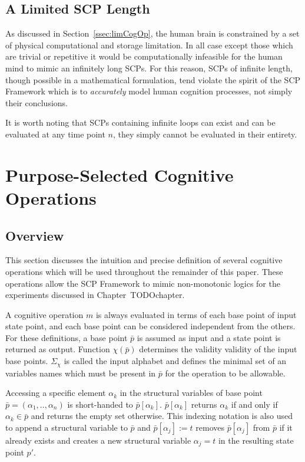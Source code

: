\subsection{A Limited SCP Length}
As discussed in Section~\ref{ssec:limCogOp}, the human brain is constrained by a set of physical computational and storage limitation. In all case except those which are trivial or repetitive it would be computationally infeasible for the human mind to mimic an infinitely long SCPs. For this reason, SCPs of infinite length, though possible in a mathematical formulation, tend violate the spirit of the SCP Framework which is to \textit{accurately} model human cognition processes, not simply their conclusions.

It is worth noting that SCPs containing infinite loops can exist and can be evaluated at any time point $n$, they simply cannot be evaluated in their entirety.

\section{Purpose-Selected Cognitive Operations}
\subsection{Overview}

This section discusses the intuition and precise definition of several cognitive operations which will be used throughout the remainder of this paper. These operations allow the SCP Framework to mimic non-monotonic logics for the experiments discussed in Chapter~TODOchapter.

A cognitive operation $m$ is always evaluated in terms of each base point of input state point, and each base point can be considered independent from the others. For these definitions, a base point $\bar{p}$ is assumed as input and a state point is returned as output. Function $\chi(\bar{p})$ determines the validity validity of the input base points. $\Sigma_\chi$ is called the input alphabet and defines the minimal set of an variables names which must be present in $\bar{p}$ for the operation to be allowable.

Accessing a specific element $\alpha_k$ in the structural variables of base point $\bar{p}=(\alpha_1,..,\alpha_n)$ is short-handed to $\bar{p}[\alpha_k]$. $\bar{p}[\alpha_k]$ returns $\alpha_k$ if and only if $\alpha_k \in \bar{p}$ and returns the empty set otherwise. This indexing notation is also used to append a structural variable to $\bar{p}$ and $\bar{p}[\alpha_j]:=t$ removes $\bar{p}[\alpha_j]$ from $\bar{p}$ if it already exists and creates a new structural variable $\alpha_j=t$ in the resulting state point $p'$.

